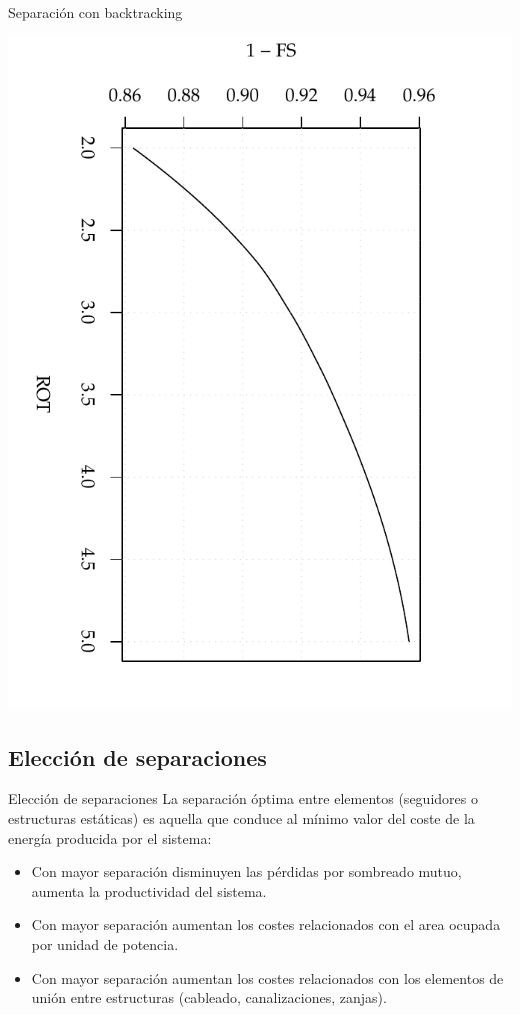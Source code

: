 \documentclass[xcolor={usenames,svgnames,dvipsnames}]{beamer}
\begin{document}
\begin{frame}[label={sec:org6539702}]{Separación con backtracking}
\begin{center}
\includegraphics[angle=90,width=.9\linewidth]{../figs/AbacoHorizBT_Ene10.pdf}
\end{center}
\end{frame}

\subsection{Elección de separaciones}
\label{sec:org1e2d8f2}

\begin{frame}[label={sec:orgfd0b80a}]{Elección de separaciones}
La \alert{separación óptima} entre elementos (seguidores o estructuras
estáticas) es aquella que conduce al \alert{mínimo valor del coste de la
energía} producida por el sistema:

\begin{itemize}
\item Con mayor separación disminuyen las \alert{pérdidas por sombreado mutuo},
aumenta la productividad del sistema.

\item Con mayor separación aumentan los \alert{costes relacionados con el area
ocupada} por unidad de potencia.

\item Con mayor separación aumentan los \alert{costes relacionados con los
elementos de unión entre estructuras} (cableado, canalizaciones,
zanjas).
\end{itemize}
\end{frame}
\end{document}
